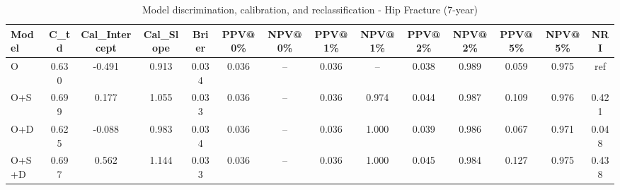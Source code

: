 \begin{table}[htbp]
\centering
\small
\caption{Model discrimination, calibration, and reclassification - Hip Fracture (7-year)}
\label{tab:perf_pd_7y}
\begin{tabular}{lccccccccccccc}
\toprule
Model & C\_td & Cal\_Intercept & Cal\_Slope & Brier & PPV@0\% & NPV@0\% & PPV@1\% & NPV@1\% & PPV@2\% & NPV@2\% & PPV@5\% & NPV@5\% & NRI \\
\midrule
O & 0.630 & -0.491 & 0.913 & 0.034 & 0.036 & -- & 0.036 & -- & 0.038 & 0.989 & 0.059 & 0.975 & ref \\
O+S & 0.699 & 0.177 & 1.055 & 0.033 & 0.036 & -- & 0.036 & 0.974 & 0.044 & 0.987 & 0.109 & 0.976 & 0.421 \\
O+D & 0.625 & -0.088 & 0.983 & 0.034 & 0.036 & -- & 0.036 & 1.000 & 0.039 & 0.986 & 0.067 & 0.971 & 0.048 \\
O+S+D & 0.697 & 0.562 & 1.144 & 0.033 & 0.036 & -- & 0.036 & 1.000 & 0.045 & 0.984 & 0.127 & 0.975 & 0.438 \\
\bottomrule
\end{tabular}
\end{table}
